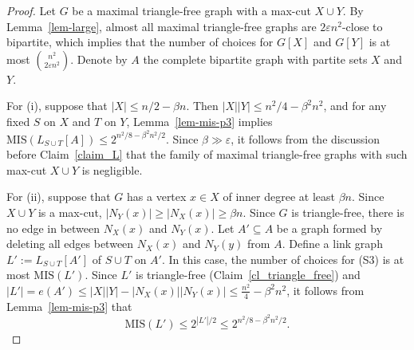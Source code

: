 \documentclass[12pt]{article}
\theoremstyle{definition}
\theoremstyle{definition}
\theoremstyle{definition}
\theoremstyle{definition}
\theoremstyle{definition}
\theoremstyle{definition}
\theoremstyle{definition}
\newcommand{\ep}{\varepsilon}
\newcommand{\3}{\bf{3}}
\newcommand{\MIS}{\mathrm{MIS}}
\begin{document}
\begin{proof}

Let $G$ be a maximal triangle-free graph with a max-cut $X\cup Y$. By Lemma~\ref{lem-large}, almost all maximal triangle-free graphs are $2\ep n^2$-close to bipartite, which implies that the number of choices for $G[X]$ and $G[Y]$ is at most ${n^2\choose 2\ep n^2}$. Denote by $A$ the complete bipartite graph with partite sets $X$ and $Y$.

For (i), suppose that $|X|\leq n/2-\beta n$. Then $|X||Y|\leq n^2/4-\beta^2 n^2$, and for any fixed $S$ on $X$ and $T$ on $Y$, Lemma~\ref{lem-mis-p3} implies $\MIS(L_{S\cup T}[A])\leq 2^{n^2/8-\beta^2 n^2/2}$. Since $\beta\gg \ep$, it follows from the discussion before Claim~\ref{claim_L} that the family of maximal triangle-free graphs with such max-cut $X\cup Y$ is negligible.

For (ii), suppose that $G$ has a vertex $x\in X$ of inner degree at least $\beta n$. Since $X\cup Y$ is a max-cut, $|N_Y(x)|\ge|N_X(x)|\ge\beta n$. Since $G$ is triangle-free, there is no edge in between $N_X(x)$ and $N_Y(x)$. Let $A'\subseteq A$ be a graph formed by deleting all edges between $N_X(x)$ and $N_Y(y)$ from $A$. Define a link graph $L':=L_{S\cup T}[A']$ of $S\cup T$ on $A'$. In this case, the number of choices for (S3) is at most $\MIS(L')$. Since  $L'$ is triangle-free (Claim~\ref{cl_triangle_free}) and $|L'|=e(A')\leq |X| |Y|-|N_X(x)||N_Y(x)|\leq \frac{n^2}{4}-\beta^2 n^2$, it follows from Lemma~\ref{lem-mis-p3} that $$\MIS(L')\le 2^{|L'|/2}\le 2^{n^2/8-\beta^2n^2/2}.$$
\end{proof}
\end{document}
